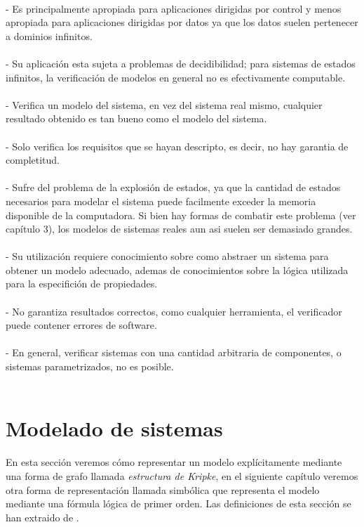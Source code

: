 \\
- Es principalmente apropiada para aplicaciones dirigidas por control y menos apropiada para aplicaciones dirigidas por datos ya que los datos suelen pertenecer a dominios infinitos.\\
\\
- Su aplicación esta sujeta a problemas de decidibilidad; para sistemas de estados infinitos, la verificación de modelos en general no es efectivamente computable.\\
\\
- Verifica un modelo del sistema, en vez del sistema real mismo, cualquier resultado obtenido es tan bueno como el modelo del sistema.\\
\\
- Solo verifica los requisitos que se hayan descripto, es decir, no hay garantia de completitud.\\
\\
- Sufre del problema de la explosión de estados, ya que la cantidad de estados necesarios para modelar el sistema puede facilmente exceder la memoria disponible de la computadora. Si bien hay formas de combatir este problema (ver capítulo 3), los modelos de sistemas reales aun asi suelen ser demasiado grandes.\\
\\
- Su utilización requiere conocimiento sobre como abstraer un sistema para obtener un modelo adecuado, ademas de conocimientos sobre la lógica utilizada para la especifición de propiedades.\\
\\
- No garantiza resultados correctos, como cualquier herramienta, el verificador puede contener errores de software.\\
\\
- En general, verificar sistemas con una cantidad arbitraria de componentes, o sistemas parametrizados, no es posible.\\
\\
\section{Modelado de sistemas}
En esta sección veremos cómo representar un modelo explícitamente mediante una forma de grafo llamada \emph{estructura de Kripke}, en el siguiente capítulo veremos otra forma de representación llamada simbólica que representa el modelo mediante una fórmula lógica de primer orden. Las definiciones de esta sección se han extraido de \cite{Clarke:1}.

